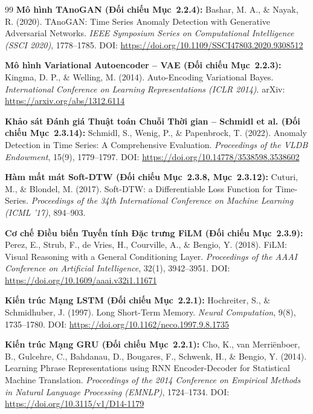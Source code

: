 \begin{thebibliography}{99}
     \textbf{Mô hình TAnoGAN (Đối chiếu Mục~2.2.4):} Bashar, M. A., \& Nayak, R. (2020). TAnoGAN: Time Series Anomaly Detection with Generative Adversarial Networks. \textit{IEEE Symposium Series on Computational Intelligence (SSCI 2020)}, 1778--1785. DOI: \url{https://doi.org/10.1109/SSCI47803.2020.9308512}
    
     \textbf{Mô hình Variational Autoencoder -- VAE (Đối chiếu Mục~2.2.3):} Kingma, D. P., \& Welling, M. (2014). Auto-Encoding Variational Bayes. \textit{International Conference on Learning Representations (ICLR 2014)}. arXiv: \url{https://arxiv.org/abs/1312.6114}
    
     \textbf{Khảo sát Đánh giá Thuật toán Chuỗi Thời gian -- Schmidl et al. (Đối chiếu Mục~2.3.14):} Schmidl, S., Wenig, P., \& Papenbrock, T. (2022). Anomaly Detection in Time Series: A Comprehensive Evaluation. \textit{Proceedings of the VLDB Endowment}, 15(9), 1779--1797. DOI: \url{https://doi.org/10.14778/3538598.3538602}
    
     \textbf{Hàm mất mát Soft-DTW (Đối chiếu Mục~2.3.8, Mục~2.3.12):} Cuturi, M., \& Blondel, M. (2017). Soft-DTW: a Differentiable Loss Function for Time-Series. \textit{Proceedings of the 34th International Conference on Machine Learning (ICML '17)}, 894--903.
    
     \textbf{Cơ chế Điều biến Tuyến tính Đặc trưng FiLM (Đối chiếu Mục~2.3.9):} Perez, E., Strub, F., de Vries, H., Courville, A., \& Bengio, Y. (2018). FiLM: Visual Reasoning with a General Conditioning Layer. \textit{Proceedings of the AAAI Conference on Artificial Intelligence}, 32(1), 3942--3951. DOI: \url{https://doi.org/10.1609/aaai.v32i1.11671}

     \textbf{Kiến trúc Mạng LSTM (Đối chiếu Mục~2.2.1):} Hochreiter, S., \& Schmidhuber, J. (1997). Long Short-Term Memory. \textit{Neural Computation}, 9(8), 1735--1780. DOI: \url{https://doi.org/10.1162/neco.1997.9.8.1735}
    
     \textbf{Kiến trúc Mạng GRU (Đối chiếu Mục~2.2.1):} Cho, K., van Merri{\"e}nboer, B., Gulcehre, C., Bahdanau, D., Bougares, F., Schwenk, H., \& Bengio, Y. (2014). Learning Phrase Representations using RNN Encoder-Decoder for Statistical Machine Translation. \textit{Proceedings of the 2014 Conference on Empirical Methods in Natural Language Processing (EMNLP)}, 1724--1734. DOI: \url{https://doi.org/10.3115/v1/D14-1179}
    

\end{thebibliography}
